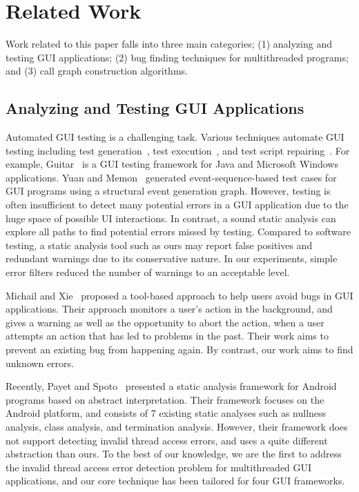 
\tinystep
\section{Related Work}

Work related to this paper falls into three main categories; (1)
analyzing and testing GUI applications; (2)
bug finding techniques for multithreaded programs; and (3)
call graph construction algorithms.

\tinystep
\subsection{Analyzing and Testing GUI Applications}

Automated GUI testing is a challenging task.
Various techniques automate GUI testing including
test generation~\cite{YuanMemonICSE2007},
test execution~\cite{YuanCohenMemonTSE2011},
and test script repairing~\cite{Huang:2010:RGT:1828417.1828465, Daniel:2011:AGR:2002931.2002937}.
For example,
Guitar~\cite{YuanCohenMemonTSE2011, YuanMemonICSE2007}
is a GUI testing framework for Java and Microsoft Windows applications. 
Yuan and Memon~\cite{YuanMemonICSE2007} generated event-sequence-based test cases for GUI
programs using a structural event generation graph. 
However, testing is often insufficient to detect many potential
errors in a GUI application due to the huge space of possible UI interactions.
In contrast, a sound static analysis can explore all paths to find potential errors missed by testing.
Compared to software testing, a static analysis tool such as ours may
report false positives and redundant warnings due to its conservative nature.
In our experiments, simple error filters reduced the number of warnings to
an acceptable level.


Michail and Xie~\cite{michail05:helping} proposed a tool-based approach to help users avoid bugs
in GUI applications. Their approach monitors a user's action in the background,
and gives a warning as well as the opportunity to abort the action, when
a user attempts an action that has led to problems in the past. 
Their work aims to prevent an existing bug from happening again.
By contrast, our work aims to find unknown errors.


Recently, Payet and Spoto~\cite{Payet:2011:SAA:2032266.2032299} presented a static
analysis framework for Android programs based on  abstract
interpretation. Their framework focuses on the Android platform, and
 consists of 7 existing static analyses such as
nullness analysis, class analysis, and termination analysis.  However,
their framework does not support detecting invalid thread access
errors, and uses a quite different abstraction than ours.
To the best of our knowledge, we are the first to address the invalid
thread access error detection problem for multithreaded GUI applications, and
our core technique has been tailored for four GUI frameworks.


